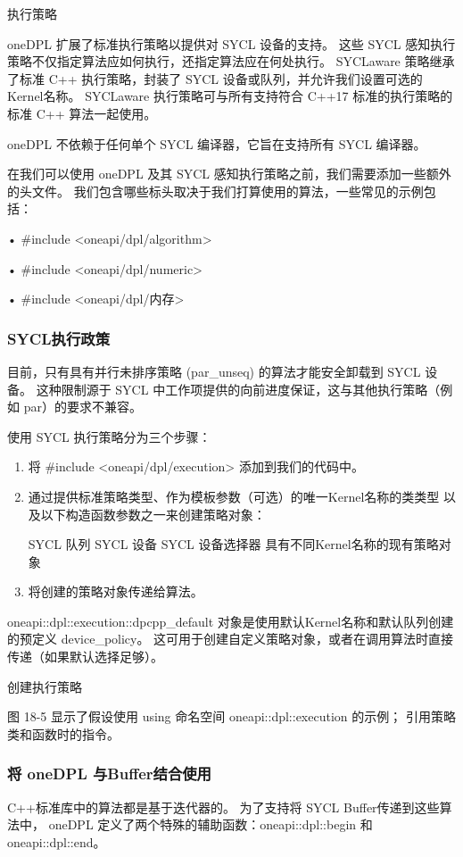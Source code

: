 {\color{red} 执行策略}

oneDPL 扩展了标准执行策略以提供对 SYCL 设备的支持。 
这些 SYCL 感知执行策略不仅指定算法应如何执行，还指定算法应在何处执行。 
SYCLaware 策略继承了标准 C++ 执行策略，封装了 SYCL 设备或队列，并允许我们设置可选的Kernel名称。 
SYCLaware 执行策略可与所有支持符合 C++17 标准的执行策略的标准 C++ 算法一起使用。

oneDPL 不依赖于任何单个 SYCL 编译器，它旨在支持所有 SYCL 编译器。

在我们可以使用 oneDPL 及其 SYCL 感知执行策略之前，我们需要添加一些额外的头文件。 
我们包含哪些标头取决于我们打算使用的算法，一些常见的示例包括：

• \#include <oneapi/dpl/algorithm>

• \#include <oneapi/dpl/numeric>

• \#include <oneapi/dpl/内存>

\subsubsection{SYCL执行政策}
目前，只有具有并行未排序策略 (par\_unseq) 的算法才能安全卸载到 SYCL 设备。 
这种限制源于 SYCL 中工作项提供的向前进度保证，这与其他执行策略（例如 par）的要求不兼容。

使用 SYCL 执行策略分为三个步骤：

\begin{enumerate}
	\item 将 \#include <oneapi/dpl/execution> 添加到我们的代码中。

	\item 通过提供标准策略类型、作为模板参数（可选）的唯一Kernel名称的类类型
	以及以下构造函数参数之一来创建策略对象：

		SYCL 队列 SYCL 设备 SYCL 设备选择器 具有不同Kernel名称的现有策略对象

	\item 将创建的策略对象传递给算法。
\end{enumerate}

oneapi::dpl::execution::dpcpp\_default 对象是使用默认Kernel名称和默认队列创建的预定义 device\_policy。 
这可用于创建自定义策略对象，或者在调用算法时直接传递（如果默认选择足够）。

{\color{red} 创建执行策略}

图 18-5 显示了假设使用 using 命名空间 oneapi::dpl::execution 的示例； 引用策略类和函数时的指令。

\subsubsection{将 oneDPL 与Buffer结合使用}
C++标准库中的算法都是基于迭代器的。 为了支持将 SYCL Buffer传递到这些算法中，
oneDPL 定义了两个特殊的辅助函数：oneapi::dpl::begin 和 oneapi::dpl::end。


